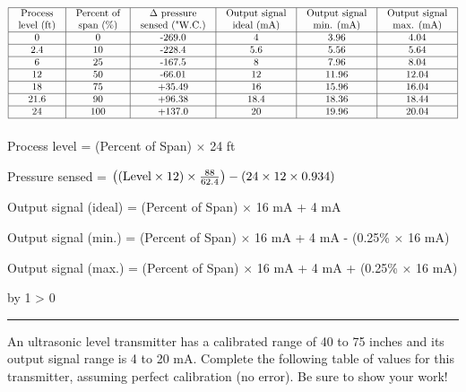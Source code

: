 \documentclass[12pt,a4paper]{article}
\def\oppgave{
            \advance\questnum by 1
            \ifnum \questnum > 0
                 \hrule
                 \vskip 3pt
                 \leftline{Oppgave \the\questnum}
                 \vskip 3pt \fi}
\begin{document}
$$\vbox{\offinterlineskip
\halign{\strut
\vrule \quad\hfil # \ \hfil & 
\vrule \quad\hfil # \ \hfil & 
\vrule \quad\hfil # \ \hfil & 
\vrule \quad\hfil # \ \hfil & 
\vrule \quad\hfil # \ \hfil & 
\vrule \quad\hfil # \ \hfil \vrule \cr
\noalign{\hrule}
%
Process & Percent of & $\Delta$ pressure & Output signal & Output signal & Output signal \cr
%
level (ft) & span (\%) & sensed ("W.C.) & ideal (mA) & min. (mA) & max. (mA) \cr
%
\noalign{\hrule}
%
0  & 0 & -269.0 & 4 & 3.96 & 4.04 \cr
%
\noalign{\hrule}
%
2.4  & 10 & -228.4 & 5.6 & 5.56 & 5.64 \cr
%
\noalign{\hrule}
%
6  & 25 & -167.5 & 8 & 7.96 & 8.04 \cr
%
\noalign{\hrule}
%
12  & 50 & -66.01 & 12 & 11.96 & 12.04 \cr
%
\noalign{\hrule}
%
18  & 75 & +35.49 & 16 & 15.96 & 16.04 \cr
%
\noalign{\hrule}
%
21.6  & 90 & +96.38 & 18.4 & 18.36 & 18.44 \cr
%
\noalign{\hrule}
%
24  & 100 & +137.0 & 20 & 19.96 & 20.04 \cr
%
\noalign{\hrule}
} %
}$$ %

\vskip 10pt

Process level = (Percent of Span) $\times$ 24 ft

\vskip 10pt

Pressure sensed = $\left( (\hbox{Level} \times 12) \times {88 \over 62.4} \right) - (24 \times 12 \times 0.934)$

\vskip 10pt

Output signal (ideal) = (Percent of Span) $\times$ 16 mA + 4 mA 

\vskip 10pt

Output signal (min.) = (Percent of Span) $\times$ 16 mA + 4 mA - (0.25\% $\times$ 16 mA) 

\vskip 10pt

Output signal (max.) = (Percent of Span) $\times$ 16 mA + 4 mA + (0.25\% $\times$ 16 mA) 

\vskip 10pt




\vfil \eject 



\oppgave{} 

An ultrasonic level transmitter has a calibrated range of 40 to 75 inches and its output signal range is 4 to 20 mA.  Complete the following table of values for this transmitter, assuming perfect calibration (no error).  Be sure to show your work!
\end{document}
